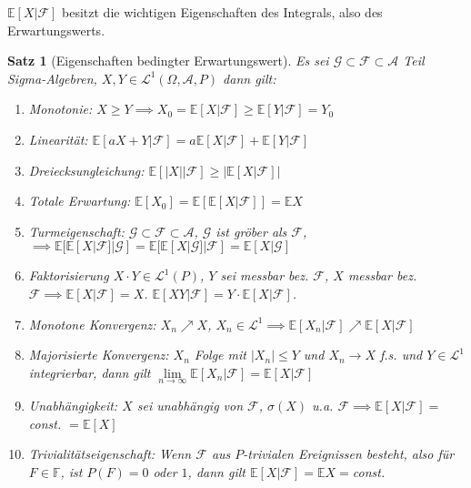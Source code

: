 \documentclass[]{article}
\newtheorem{theorem}{Satz}
\begin{document}
$\mathbb{E}[X|\mathcal{F}]$ besitzt die wichtigen Eigenschaften des Integrals, also des Erwartungswerts.

\begin{theorem}[Eigenschaften bedingter Erwartungswert]
	Es sei $\mathcal{G} \subset \mathcal{F} \subset \mathcal{A}$ Teil Sigma-Algebren, $X,Y \in \mathcal{L}^1(\Omega, \mathcal{A}, P)$ dann gilt:
	\begin{enumerate}
		\item Monotonie: $X \geq Y \implies X_0=\mathbb{E}[X|\mathcal{F}] \geq \mathbb{E}[Y|\mathcal{F}]=Y_0$
		\item Linearität: $\mathbb{E}[aX+Y|\mathcal{F}] = a \mathbb{E}[X|\mathcal{F}] + \mathbb{E}[Y|\mathcal{F}]$
		\item Dreiecksungleichung: $\mathbb{E}[|X| |\mathcal{F}] \geq \left|\mathbb{E}[X |\mathcal{F}]\right|$
		\item Totale Erwartung: $\mathbb{E}[X_0] = \mathbb{E}[\mathbb{E}[X|\mathcal{F}]] = \mathbb{E}X$
		\item Turmeigenschaft: $\mathcal{G} \subset \mathcal{F} \subset \mathcal{A}$, $\mathcal{G}$ ist gröber als $\mathcal{F}$, $\implies \mathbb{E}[\mathbb{E}[X|\mathcal{F}] | \mathcal{G}] = \mathbb{E}[\mathbb{E}[X|\mathcal{G}] | \mathcal{F}] = \mathbb{E}[X|\mathcal{G}]$
		\item Faktorisierung $X\cdot Y \in \mathcal{L}^1(P)$, $Y$ sei messbar bez. $\mathcal{F}$, $X$ messbar bez. $\mathcal{F} \implies \mathbb{E}[X|\mathcal{F}]=X$. $\mathbb{E}[XY|\mathcal{F}]=Y\cdot \mathbb{E}[X|\mathcal{F}]$.
		\item Monotone Konvergenz: $X_n \nearrow X$, $X_n \in \mathcal{L}^1 \implies \mathbb{E}[X_n|\mathcal{F}] \nearrow \mathbb{E}[X|\mathcal{F}]$
		\item Majorisierte Konvergenz: $X_n$ Folge mit $|X_n| \leq Y$ und $X_n \rightarrow X$ f.s. und $Y \in \mathcal{L}^1$ integrierbar, dann gilt $\lim\limits_{n\rightarrow\infty}\mathbb{E}[X_n|\mathcal{F}] = \mathbb{E}[X|\mathcal{F}]$
		\item Unabhängigkeit: $X$ sei unabhängig von $\mathcal{F}$, $\sigma(X)$ u.a. $\mathcal{F} \implies \mathbb{E}[X|\mathcal{F}] = $ const. $= \mathbb{E}[X]$
		\item Trivialitätseigenschaft: Wenn $\mathcal{F}$ aus $P$-trivialen Ereignissen besteht, also für $F\in\mathbb{F}$, ist $P(F) = 0$ oder $1$, dann gilt $\mathbb{E}[X|\mathcal{F}]=\mathbb{E}X = $const.
	\end{enumerate}
\end{theorem}
\end{document}
